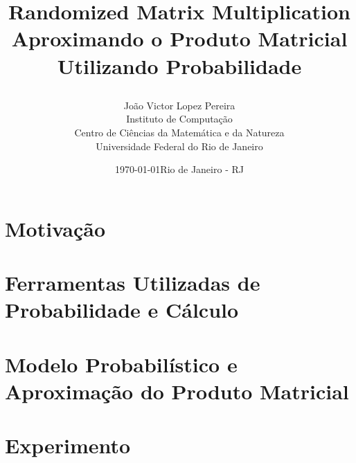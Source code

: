 \documentclass[a4paper, 11pt]{report}
\begin{document}
  \title{
    \begin{figure}
      \centering
    \end{figure}
    \Huge{Randomized Matrix Multiplication} \\
    \Huge{Aproximando o Produto Matricial Utilizando Probabilidade}
  }
  \date{\Large{\today \vfill Rio de Janeiro - RJ}}
  \author{
    \LARGE{João Victor Lopez Pereira}
    \vspace{1cm} \\
    \Large{Instituto de Computação} \\
    \Large{Centro de Ciências da Matemática e da Natureza} \\
    \Large{Universidade Federal do Rio de Janeiro}
  }
  \maketitle
  \newpage
  \tableofcontents
  \newpage

  \chapter{Motivação}
    

  \chapter{Ferramentas Utilizadas de Probabilidade e Cálculo}
    

  \chapter{Modelo Probabilístico e Aproximação do Produto Matricial}
    

  \chapter{Experimento}
    

  \newpage
  \nocite{*}
  \printbibliography
\end{document}

